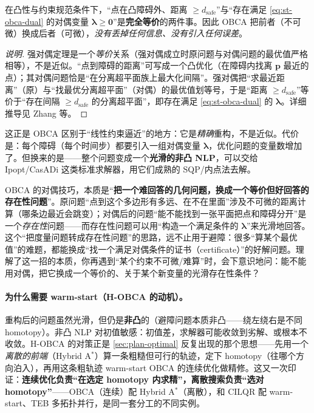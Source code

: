 \begin{theorem}[强对偶下的精确重构]\label{thm:st-obca-exact}
在凸性与约束规范条件下，“点在凸障碍外、距离 $\ge d_{\text{safe}}$”与“存在满足 \cref{eq:st-obca-dual} 的对偶变量 $\boldsymbol\lambda\ge\mathbf 0$”是\textbf{完全等价}的两件事。因此 OBCA 把前者（不可微）换成后者（可微），\emph{没有丢掉任何信息、没有引入任何误差}。
\end{theorem}
\begin{proof}[说明]
强对偶定理是一个\emph{等价}关系（强对偶成立时原问题与对偶问题的最优值严格相等），不是近似。“点到障碍的距离”可写成一个凸优化（在障碍内找离 $\mathbf p$ 最近的点）；其对偶问题恰是“在分离超平面族上最大化间隔”。强对偶把“求最近距离”（原）与“找最优分离超平面”（对偶）的最优值划等号，于是“距离 $\ge d_{\text{safe}}$”等价于“存在间隔 $\ge d_{\text{safe}}$ 的分离超平面”，即存在满足 \cref{eq:st-obca-dual} 的 $\boldsymbol\lambda$。详细推导见 Zhang 等\cite{zhang2021obca}。
\end{proof}

\noindent 这正是 OBCA 区别于“线性约束逼近”的地方：它是\emph{精确}重构，不是近似。代价是：每个障碍（每个时间步）都要引入一组对偶变量 $\boldsymbol\lambda$，优化问题的变量数增加了。但换来的是——整个问题变成一个\textbf{光滑的非凸 NLP}，可以交给 Ipopt/CasADi 这类标准求解器，用它们成熟的 SQP/内点法去解。

\begin{insight}
OBCA 的对偶技巧，本质是“\textbf{把一个难回答的几何问题，换成一个等价但好回答的存在性问题}”。原问题“点到这个多边形有多远、在不在里面”涉及不可微的距离计算（哪条边最近会跳变）；对偶后的问题“能不能找到一张平面把点和障碍分开”是一个\emph{存在性}问题——而存在性问题可以用“构造一个满足条件的 $\boldsymbol\lambda$”来光滑地回答。这个“把度量问题转成存在性问题”的思路，远不止用于避障：很多“算某个最优值”的难题，都能换成“找一个满足对偶条件的证书（certificate）”的好解问题。理解了这一招的本质，你再遇到“某个约束不可微/难算”时，会下意识地问：能不能用对偶，把它换成一个等价的、关于某个新变量的光滑存在性条件？
\end{insight}

\paragraph{为什么需要 warm-start（H-OBCA 的动机）。}
重构后的问题虽然光滑，但仍是\textbf{非凸}的（避障问题本质非凸——绕左绕右是不同 homotopy）。非凸 NLP 对初值敏感：初值差，求解器可能收敛到劣解、或根本不收敛。H-OBCA 的对策正是 \cref{sec:plan-optimal} 反复出现的那个思想——先用一个\emph{离散的前端}（Hybrid A$^*$）算一条粗糙但可行的轨迹，定下 homotopy（往哪个方向泊入），再用这条粗轨迹 warm-start OBCA 的连续优化做精修\cite{zhang2018hobca}。这又一次印证：\textbf{连续优化负责“在选定 homotopy 内求精”，离散搜索负责“选对 homotopy”}——OBCA（连续）配 Hybrid A$^*$（离散），和 CILQR 配 warm-start、TEB 多拓扑并行，是同一套分工的不同实例。

